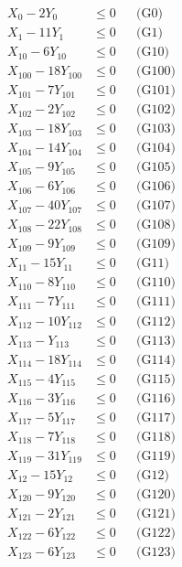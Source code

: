 \documentclass[a4paper,10pt]{article}
\begin{document}
\allowdisplaybreaks
{\small\begin{align}
X_{0} - 2Y_{0} &\leq 0 && \text{(G0)} \\
X_{1} - 11Y_{1} &\leq 0 && \text{(G1)} \\
X_{10} - 6Y_{10} &\leq 0 && \text{(G10)} \\
X_{100} - 18Y_{100} &\leq 0 && \text{(G100)} \\
X_{101} - 7Y_{101} &\leq 0 && \text{(G101)} \\
X_{102} - 2Y_{102} &\leq 0 && \text{(G102)} \\
X_{103} - 18Y_{103} &\leq 0 && \text{(G103)} \\
X_{104} - 14Y_{104} &\leq 0 && \text{(G104)} \\
X_{105} - 9Y_{105} &\leq 0 && \text{(G105)} \\
X_{106} - 6Y_{106} &\leq 0 && \text{(G106)} \\
X_{107} - 40Y_{107} &\leq 0 && \text{(G107)} \\
X_{108} - 22Y_{108} &\leq 0 && \text{(G108)} \\
X_{109} - 9Y_{109} &\leq 0 && \text{(G109)} \\
X_{11} - 15Y_{11} &\leq 0 && \text{(G11)} \\
X_{110} - 8Y_{110} &\leq 0 && \text{(G110)} \\
X_{111} - 7Y_{111} &\leq 0 && \text{(G111)} \\
X_{112} - 10Y_{112} &\leq 0 && \text{(G112)} \\
X_{113} - Y_{113} &\leq 0 && \text{(G113)} \\
X_{114} - 18Y_{114} &\leq 0 && \text{(G114)} \\
X_{115} - 4Y_{115} &\leq 0 && \text{(G115)} \\
\allowbreak
X_{116} - 3Y_{116} &\leq 0 && \text{(G116)} \\
X_{117} - 5Y_{117} &\leq 0 && \text{(G117)} \\
X_{118} - 7Y_{118} &\leq 0 && \text{(G118)} \\
X_{119} - 31Y_{119} &\leq 0 && \text{(G119)} \\
X_{12} - 15Y_{12} &\leq 0 && \text{(G12)} \\
X_{120} - 9Y_{120} &\leq 0 && \text{(G120)} \\
X_{121} - 2Y_{121} &\leq 0 && \text{(G121)} \\
X_{122} - 6Y_{122} &\leq 0 && \text{(G122)} \\
X_{123} - 6Y_{123} &\leq 0 && \text{(G123)} \\

\end{align}}
\end{document}
